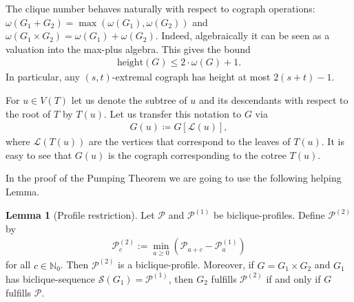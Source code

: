 \documentclass{article}
\newcommand{\NN}{\mathbb{N}}
\theoremstyle{definition}
\theoremstyle{definition}
\theoremstyle{definition}
\theoremstyle{definition}
\theoremstyle{definition}
\theoremstyle{definition}
\theoremstyle{definition}
\newtheorem{Lemma}{Lemma}
\theoremstyle{definition}
\theoremstyle{definition}
\theoremstyle{definition}
\begin{document}
The clique number behaves naturally with respect to cograph operations: $\omega(G_1 + G_2) = \max(\omega(G_1), \omega(G_2))$ and $\omega(G_1 \times G_2) = \omega(G_1) + \omega(G_2)$. Indeed, algebraically it can be seen as a valuation into the max-plus algebra.
This gives the bound
\begin{align}
    \text{height}(G) \leq 2 \cdot \omega(G) + 1. \label{eq:height_omega}
\end{align}
In particular, any $(s,t)$-extremal cograph has height at most $2(s+t) - 1$.

For $u \in V(T)$ let us denote the subtree of $u$ and its descendants with respect to the root of $T$ by $T(u)$. Let us transfer this notation to $G$ via
\begin{align}
    G(u) \coloneqq G[\mathscr{L}(u)],
\end{align}
where $\mathscr{L}(T(u))$ are the vertices that correspond to the leaves of $T(u)$.
It is easy to see that $G(u)$ is the cograph corresponding to the cotree $T(u)$.

In the proof of the Pumping Theorem we are going to use the following helping Lemma.

\begin{Lemma}[Profile restriction] \label{thm:profile_restriction}
    Let $\mathscr{P}$ and $\mathscr{P}^{(1)}$ be biclique-profiles. Define $\mathscr{P}^{(2)}$ by
    \begin{align}
        \mathscr{P}^{(2)}_{c} := \min_{a \geq 0} \left( \mathscr{P}_{a+c} - \mathscr{P}^{(1)}_{a} \right) \label{eq:profile_restriction}
    \end{align}
    for all $c \in \NN_0$. Then $\mathscr{P}^{(2)}$ is a biclique-profile. Moreover, if $G = G_1 \times G_2$ and $G_1$ has biclique-sequence $\mathscr{S}(G_1) = \mathscr{P}^{(1)}$, then $G_2$ fulfills $\mathscr{P}^{(2)}$ if and only if $G$ fulfills $\mathscr{P}$.
\end{Lemma}
\end{document}
